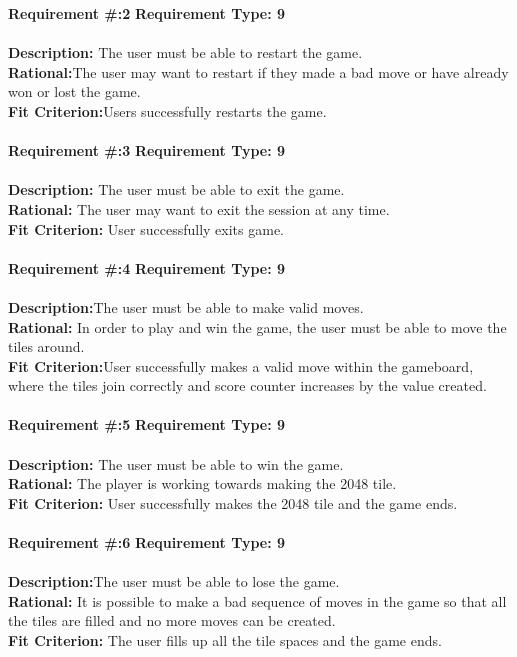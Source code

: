 \textbf {Requirement \#:2} \indent\textbf {Requirement Type: 9} \\\\
\textbf {Description:} The user must be able to restart the game.\\
\textbf {Rational:}The user may want to restart if they made a bad move or have already won or lost the game. \\
\textbf {Fit Criterion:}Users successfully restarts the game. \\\\

\textbf {Requirement \#:3} \indent\textbf {Requirement Type: 9}\\\\
\textbf {Description:} The user must be able to exit the game.\\
\textbf {Rational:} The user may want to exit the session at any time.\\
\textbf {Fit Criterion:} User successfully exits game. \\\\

\textbf {Requirement \#:4} \indent\textbf {Requirement Type: 9}\\\\
\textbf {Description:}The user must be able to make valid moves. \\
\textbf {Rational:} In order to play and win the game, the user must be able to move the tiles around. \\
\textbf {Fit Criterion:}User successfully makes a valid move within the gameboard, where the tiles join correctly and score counter increases by the value created. \\\\

\textbf {Requirement \#:5} \indent\textbf {Requirement Type: 9} \\\\
\textbf {Description:} The user must be able to win the game.\\
\textbf {Rational:} The player is working towards making the 2048 tile. \\
\textbf {Fit Criterion:} User successfully makes the 2048 tile and the game ends. \\\\

\textbf {Requirement \#:6} \indent\textbf {Requirement Type: 9}\\\\
\textbf {Description:}The user must be able to lose the game. \\
\textbf {Rational:} It is possible to make a bad sequence of moves in the game so that all the tiles are filled and 
no more moves can be created.\\
\textbf {Fit Criterion:} The user fills up all the tile spaces and the game ends.\\\\

